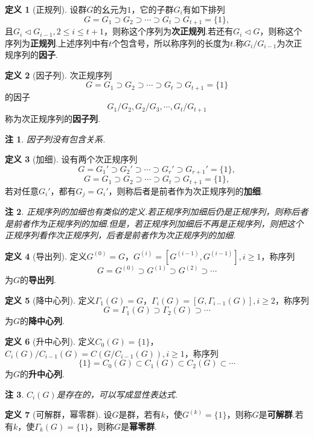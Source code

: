 \documentclass[12pt]{ctexart}
\theoremstyle{definition}
\newtheorem{definition}{定义}[section]
\theoremstyle{plain}
\newtheorem*{remark}{注}
\begin{document}
\begin{definition}[正规列]
	设群$G$的幺元为$1$，它的子群$G_i$有如下排列
	$$G=G_1\supset G_2\supset\cdots\supset G_t\supset G_{t+1}=\{1\},$$
	且$G_i\lhd G_{i-1},2\leqslant i\leqslant t+1$，则称这个序列为\textbf{次正规列}.若还有$G_i\lhd G$，则称这个序列为\textbf{正规列}.上述序列中有$t$个包含号，所以称序列的长度为$t$.称$G_i/G_{i-1}$为次正规序列的\textbf{因子}.
\end{definition}
\begin{definition}[因子列]
	次正规序列
	$$G=G_1\supset G_2\supset\cdots\supset G_t\supset G_{t+1}=\{1\}$$
	的因子
	$$G_1/G_2,G_2/G_3,\cdots,G_t/G_{t+1}$$
	称为次正规序列的\textbf{因子列}.
\end{definition}
\begin{remark}
	因子列没有包含关系.
\end{remark}
\begin{definition}[加细]
	设有两个次正规序列
	$$G=G_1'\supset G_2'\supset\cdots\supset G_r'\supset G_{r+1}'=\{1\},$$
	$$G=G_1\supset G_2\supset\cdots\supset G_t\supset G_{t+1}=\{1\},$$
	若对任意$G_i'$，都有$G_j=G_i'$，则称后者是前者作为次正规序列的\textbf{加细}.
\end{definition}
\begin{remark}
	正规序列的加细也有类似的定义.若正规序列加细后仍是正规序列，则称后者是前者作为正规序列的加细.但是，若正规序列加细后不再是正规序列，则把这个正规序列看作次正规序列，后者是前者作为次正规序列的加细.
\end{remark}
\begin{definition}[导出列]
	定义$G^{(0)}=G$，$G^{(i)}=\left[G^{(i-1)},G^{(i-1)}\right],i\geqslant1$，称序列
	$$G=G^{(0)}\supset G^{(1)}\supset G^{(2)}\supset\cdots$$
	为$G$的\textbf{导出列}.
\end{definition}
\begin{definition}[降中心列]
	定义$\varGamma_1(G)=G$，$\varGamma_i(G)=\left[G,\varGamma_{i-1}(G)\right],i\geqslant 2$，称序列
	$$G=\varGamma_1(G)\supset\varGamma_2(G)\supset\cdots$$
	为$G$的\textbf{降中心列}.
\end{definition}
\begin{definition}[升中心列]
	定义$C_0(G)=\{1\}$，$C_i(G)/C_{i-1}(G)=C(G/C_{i-1}(G)),i\geqslant 1$，称序列
	$$\{1\}=C_0(G)\subset C_1(G)\subset C_2(G)\subset\cdots$$
	为$G$的\textbf{升中心列}.
\end{definition}
\begin{remark}
	$C_i(G)$是存在的，可以写成显性表达式.
\end{remark}
\begin{definition}[可解群，幂零群]
	设$G$是群，若有$k$，使$G^{(k)}=\{1\}$，则称$G$是\textbf{可解群}.若有$k$，使$\varGamma_k(G)=\{1\}$，则称$G$是\textbf{幂零群}.
\end{definition}
\end{document}
